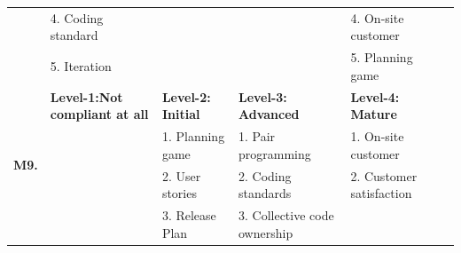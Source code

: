 \documentclass[a4paper,oneside]{bth}
\begin{document}
\begin{longtable}{|p{1.3cm}|p{2cm}|p{2cm}|p{2.7cm}|p{2cm} |p{2cm} |}
				& 4. Coding standard                                   &                                                             &                                                                                                     & 4. On-site customer                                    &                                                                                              \\ \cline{2-2} \cline{5-5}
				& 5. Iteration                                         &                                                             &                                                                                                     & 5. Planning game                                       &                                                                                              \\ \hline
				\multirow{12}{*}{\textbf{M9.}} & \textbf{Level-1:Not compliant at all}                & \textbf{Level-2: Initial}                                   & \textbf{Level-3: Advanced}                                                                          & \textbf{Level-4: Mature}                               & \textbf{}                                                                                    \\ \cline{2-6} 
				& \multirow{11}{*}{}                                   & 1. Planning game                                            & 1. Pair programming                                                                                 & 1. On-site customer                                    & \multirow{11}{*}{}                                                                           \\ \cline{3-5}
				&                                                      & 2. User stories                                             & 2. Coding standards                                                                                 & 2. Customer satisfaction                               &                                                                                              \\ \cline{3-5}
				&                                                      & 3. Release Plan                                             & 3. Collective code ownership                                                                        & \multirow{9}{*}{}                                      &                                                                                              \\ \cline{3-4}

\end{longtable}
\end{document}
